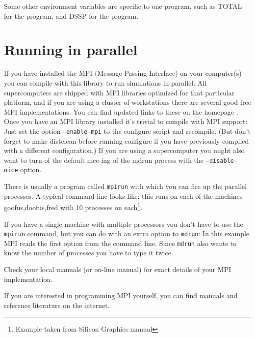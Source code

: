 Some other environment variables are specific to one program, such as
TOTAL for the {\tt {}} program, and DSSP for the
{\tt {}} program.

\section{Running {\gromacs} in parallel}
If you have installed the MPI (Message Passing Interface) on your computer(s)
you can compile {\gromacs} with this library to run simulations in parallel. 
All supercomputers are shipped with MPI libraries optimized for 
that particular platform, and if you are using a cluster of workstations
there are several good free MPI implementations. You can find updated links
to these on the {\gromacs} homepage {\wwwpage}. Once you have an MPI library
installed it's trivial to compile {\gromacs} with MPI support: Just set
the option {\tt --enable-mpi} to the configure script and recompile.
(But don't forget to make distclean before running configure if you have
previously compiled with a different configuration.) If you are using a 
supercomputer you might also want to turn of the default nice-ing of the
mdrun process with the {\tt --disable-nice} option.

There is usually a program called {\tt mpirun} with which you can fire
up the parallel processes. A typical command line looks like:
this runs on each of the machines goofus,doofus,fred with 10 processes
on each\footnote{Example taken from Silicon Graphics manual}.

If you have a single machine with multiple processors you don't have to
use the {\tt mpirun} command, but you can do with an extra option to
{\tt mdrun}:
In this example MPI reads the first option from the command line.
Since {\tt mdrun} also wants to know the number of processes you have to
type it twice.

Check your local manuals (or on-line manual) for exact details
of your MPI implementation.

If you are interested in programming MPI yourself, you can find
manuals and reference literature on the internet.



